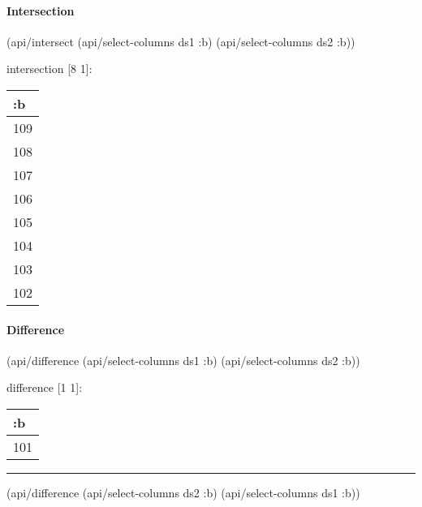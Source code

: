 \documentclass[]{article}
\newenvironment{Shaded}{\begin{snugshade}}{\end{snugshade}}
\newcommand{\AttributeTok}[1]{\textcolor[rgb]{0.77,0.63,0.00}{#1}}
\newcommand{\NormalTok}[1]{#1}
\let\oldparagraph\paragraph
\renewcommand{\paragraph}[1]{\oldparagraph{#1}\mbox{}}
\begin{document}
\hypertarget{intersection}{%
\paragraph{Intersection}\label{intersection}}

\begin{Shaded}
\begin{Highlighting}[]
\NormalTok{(api/intersect (api/select-columns ds1 }\AttributeTok{:b}\NormalTok{)}
\NormalTok{               (api/select-columns ds2 }\AttributeTok{:b}\NormalTok{))}
\end{Highlighting}
\end{Shaded}

intersection {[}8 1{]}:

\begin{longtable}[]{@{}l@{}}
\toprule
:b\tabularnewline
\midrule
\endhead
109\tabularnewline
108\tabularnewline
107\tabularnewline
106\tabularnewline
105\tabularnewline
104\tabularnewline
103\tabularnewline
102\tabularnewline
\bottomrule
\end{longtable}

\hypertarget{difference}{%
\paragraph{Difference}\label{difference}}

\begin{Shaded}
\begin{Highlighting}[]
\NormalTok{(api/difference (api/select-columns ds1 }\AttributeTok{:b}\NormalTok{)}
\NormalTok{                (api/select-columns ds2 }\AttributeTok{:b}\NormalTok{))}
\end{Highlighting}
\end{Shaded}

difference {[}1 1{]}:

\begin{longtable}[]{@{}l@{}}
\toprule
:b\tabularnewline
\midrule
\endhead
101\tabularnewline
\bottomrule
\end{longtable}

\begin{center}\rule{0.5\linewidth}{0.5pt}\end{center}

\begin{Shaded}
\begin{Highlighting}[]
\NormalTok{(api/difference (api/select-columns ds2 }\AttributeTok{:b}\NormalTok{)}
\NormalTok{                (api/select-columns ds1 }\AttributeTok{:b}\NormalTok{))}
\end{Highlighting}
\end{Shaded}
\end{document}
